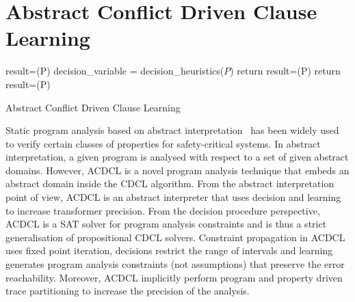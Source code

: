 \documentclass[a4paper,conference]{llncs}
\newcommand{\Omit}[1]{}
\begin{document}
\section{Abstract Conflict Driven Clause Learning}
\begin{algorithm2e}[t]
\DontPrintSemicolon
{}
\begin{small}
\assign result=\deduce(P)\;
 {
  \return \safe \;
}
\uElse
{
   {
    \return \unsafe \;
  }
}
{
  \assign decision\_variable = decision\_heuristics($P$)\;
  {
    return \unknown\; 
  }
  \uElse
  {
    \assign result=\deduce(P)\;
    {
       {
        \return \unsafe \;
      }
      \uElse 
      {
        \continue\;
      }
    }
    \uElse
    {
       {
         {
          return \safe \;  
        }
        \assign result=\deduce(P)\;
      }
    }
  }
}
\end{small}
\caption{Abstract Conflict Driven Clause Learning\label{Alg:acdcl}}
\end{algorithm2e}
%
Static program analysis based on abstract
interpretation~\cite{DBLP:conf/emsoft/Cousot07} has been widely used to
verify certain classes of properties for safety-critical systems.  In
abstract interpretation, a given program is analysed with respect to a set
of given abstract domains.  However, ACDCL is a novel program analysis 
technique that embeds an abstract domain inside the CDCL algorithm.
From the abstract interpretation point of view, ACDCL is an abstract 
interpreter that uses decision and learning to increase transformer precision. 
From the decision procedure perspective, ACDCL is a SAT solver for program 
analysis constraints and is thus a strict generalisation of propositional CDCL solvers.
Constraint propagation in ACDCL uses fixed point iteration, decisions restrict the 
range of intervals and learning generates program analysis constraints (not assumptions) 
that preserve the error reachability.  Moreover, ACDCL implicitly 
perform program and property driven trace partitioning to increase the precision
of the analysis.  
\Omit{
We observe that the abstract domains necessary for 
hardware property checking are -- booleans, constants, interval, equality 
and octagons domains.
}
\end{document}
